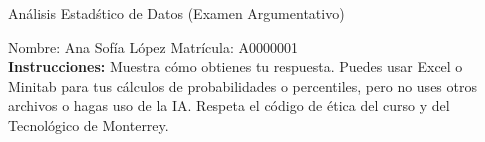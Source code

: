 \documentclass[8pt]{report}
\begin{document}
\begin{center}
{An\'alisis Estad\'stico de Datos (Examen Argumentativo)}
\end{center}

Nombre: \underline{\hspace*{.2in}}
Ana Sofía López
\underline{\hspace*{.2in}} \quad Matr\'icula:\underline{\hspace*{.2in}}
A0000001
\underline{\hspace*{.2in}} \\

{\bf Instrucciones:} Muestra c\'omo obtienes tu respuesta. Puedes usar Excel 
o Minitab para tus cálculos de probabilidades o 
percentiles, pero no uses otros archivos o hagas uso de la IA. Respeta el 
c\'odigo de \'etica del curso y del Tecnol\'ogico 
de Monterrey.
\end{document}
